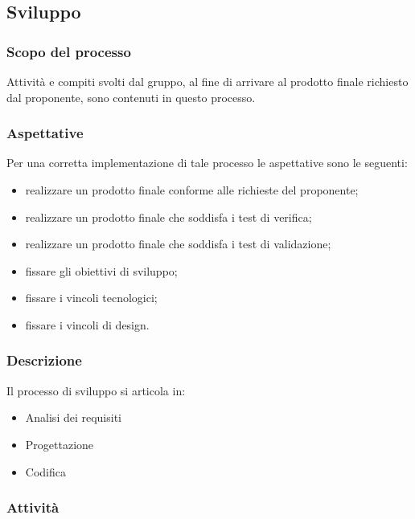 \subsection{Sviluppo}
\subsubsection{Scopo del processo}
Attività e compiti svolti dal gruppo, al fine di arrivare al prodotto finale richiesto dal proponente, sono contenuti in questo processo.
\subsubsection{Aspettative}
Per una corretta implementazione di tale processo le aspettative sono le seguenti:
\begin{itemize}
	\item realizzare un prodotto finale conforme alle richieste del proponente;
	\item realizzare un prodotto finale che soddisfa i test di verifica;
	\item realizzare un prodotto finale che soddisfa i test di validazione;
	\item fissare gli obiettivi di sviluppo;
	\item fissare i vincoli tecnologici;
	\item fissare i vincoli di design.
\end{itemize}
\subsubsection{Descrizione}
Il processo di sviluppo si articola in:
\begin{itemize}
	\item Analisi dei requisiti
	\item Progettazione
	\item Codifica	
\end{itemize}
\subsubsection{Attività}
